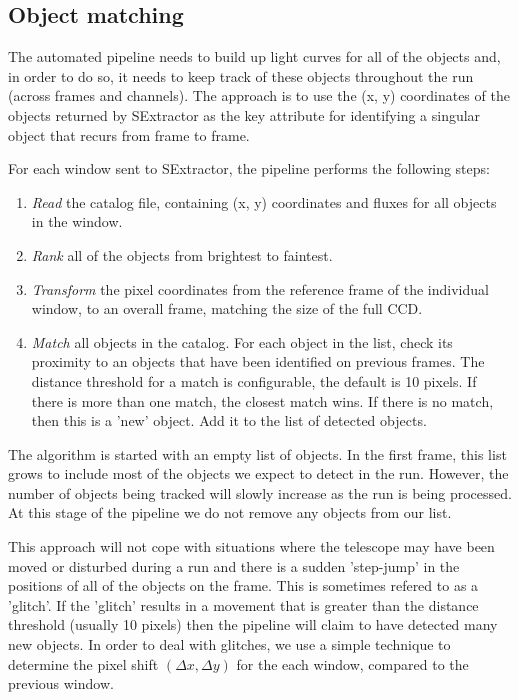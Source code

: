 \subsection{Object matching}
The automated pipeline needs to build up light curves for all of the objects and, in order to do so, it needs to keep track of these objects throughout the run (across frames and channels). The approach is to use the (x, y) coordinates of the objects returned by SExtractor as the key attribute for identifying a singular object that recurs from frame to frame. 

For each window sent to SExtractor, the pipeline performs the following steps:
\begin{enumerate}
  \item \emph{Read} the catalog file, containing (x, y) coordinates and fluxes for all objects in the window.
  \item \emph{Rank} all of the objects from brightest to faintest.
  \item \emph{Transform} the pixel coordinates from the reference frame of the individual window, to an overall frame, matching the size of the full CCD. 
  \item \emph{Match} all objects in the catalog. For each object in the list, check its proximity to an objects that have been identified on previous frames. The distance threshold for a match is configurable, the default is 10 pixels. If there is more than one match, the closest match wins. If there is no match, then this is a 'new' object. Add it to the list of detected objects. 
\end{enumerate}

The algorithm is started with an empty list of objects. In the first frame, this list grows to include most of the objects we expect to detect in the run. However, the number of objects being tracked will slowly increase as the run is being processed. At this stage of the pipeline we do not remove any objects from our list. 

This approach will not cope with situations where the telescope may have been moved or disturbed during a run and there is a sudden 'step-jump' in the positions of all of the objects on the frame. This is sometimes refered to as a 'glitch'. If the 'glitch' results in a movement that is greater than the distance threshold (usually 10 pixels) then the pipeline will claim to have detected many new objects. In order to deal with glitches, we use a simple technique to determine the pixel shift $(\Delta x, \Delta y)$ for the each window, compared to the previous window. 


